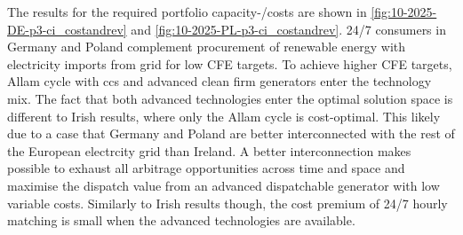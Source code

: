 The results for the required portfolio capacity-/costs are shown in \cref{fig:10-2025-DE-p3-ci_costandrev} and \cref{fig:10-2025-PL-p3-ci_costandrev}.
24/7 consumers in Germany and Poland complement procurement of renewable energy with electricity imports from grid for low CFE targets. 
To achieve higher CFE targets, Allam cycle with \gls{ccs} and advanced clean firm generators enter the technology mix. 
The fact that both advanced technologies enter the optimal solution space is different to Irish results, where only the Allam cycle is cost-optimal. 
This likely due to a case that Germany and Poland are better interconnected with the rest of the European electrcity grid than Ireland. 
A better interconnection makes possible to exhaust all arbitrage opportunities across time and space and maximise the dispatch value from an advanced dispatchable generator with low variable costs.
Similarly to Irish results though, the cost premium of 24/7 hourly matching is small when the advanced technologies are available.  

